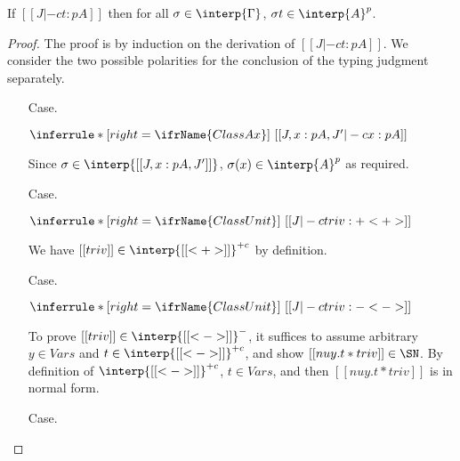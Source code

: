 \begin{thm}[Soundness]
\label{thm:sndinterp}
If $[[ J |-c t : p A]]$ then for all $\sigma\in\interp{\Gamma}$, $\sigma t\in\interp{A}^p$.
\end{thm}
\begin{proof}
The proof is by induction on the derivation of $[[ J |-c t : p A]]$.  We consider
the two possible polarities for the conclusion of the typing judgment separately.

\begin{itemize}
\item[Case.]\ 

\vspace{-.2cm}
\begin{center}
\begin{math}
\inferrule* [right=\ifrName{ClassAx}] {\ }{[[J , x : p A , J' |-c x : p A]]}
\end{math}
\end{center}

Since $\sigma\in\interp{[[J , x : p A, J']]}$, $\sigma(x)\in\interp{A}^p$ as required.

\item[Case.]\ 

\vspace{-.2cm}
\begin{center}
\begin{math}
\inferrule* [right=\ifrName{ClassUnit}] {\ }{[[J |-c triv : + < + >]]}
\end{math}
\end{center}

We have $[[triv]]\in\interp{[[<+>]]}^{+c}$ by definition.

\item[Case.]\ 

\vspace{-.2cm}
\begin{center}
\begin{math}
\inferrule* [right=\ifrName{ClassUnit}] {\ }{[[J |-c triv : - < - >]]}
\end{math}
\end{center}

To prove $[[triv]]\in\interp{[[<->]]}^{-}$, it suffices to assume
arbitrary $y\in\textit{Vars}$ and $t\in\interp{[[<->]]}^{+c}$, and
show $[[nu y . t * triv]]\in\SN$.  By definition of
$\interp{[[<->]]}^{+c}$, $t\in\textit{Vars}$, and then $[[nu y . t *
triv]]$ is in normal form.

\item[Case.]\ 


\end{itemize}
\end{proof}
